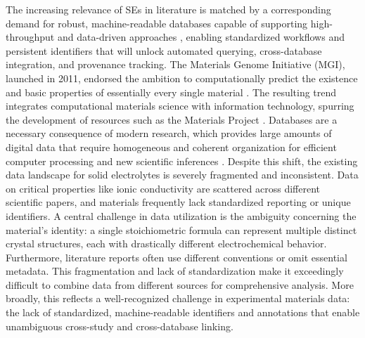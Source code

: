 \documentclass[a4paper,fleqn]{cas-sc}
\begin{document}
The increasing relevance of SEs in literature is matched by a corresponding demand for robust, machine-readable databases capable of supporting high-throughput and data-driven approaches \cite{yang2024dynamic}, enabling standardized workflows and persistent identifiers that will unlock automated querying, cross-database integration, and provenance tracking. The Materials Genome Initiative (MGI), launched in 2011, endorsed the ambition to computationally predict the existence and basic properties of essentially every single material \cite{armiento2020database}. The resulting trend integrates computational materials science with information technology, spurring the development of resources such as the Materials Project \cite{armiento2020database, jain2013commentary}. Databases are a necessary consequence of modern research, which provides large amounts of digital data that require homogeneous and coherent organization for efficient computer processing and new scientific inferences \cite{grazulis2012crystallography}. Despite this shift, the existing data landscape for solid electrolytes is severely fragmented and inconsistent. Data on critical properties like ionic conductivity are scattered across different scientific papers, and materials frequently lack standardized reporting or unique identifiers. A central challenge in data utilization is the ambiguity concerning the material's identity: a single stoichiometric formula can represent multiple distinct crystal structures, each with drastically different electrochemical behavior. Furthermore, literature reports often use different conventions or omit essential metadata. This fragmentation and lack of standardization make it exceedingly difficult to combine data from different sources for comprehensive analysis. More broadly, this reflects a well-recognized challenge in experimental materials data: the lack of standardized, machine-readable identifiers and annotations that enable unambiguous cross-study and cross-database linking.
\end{document}

